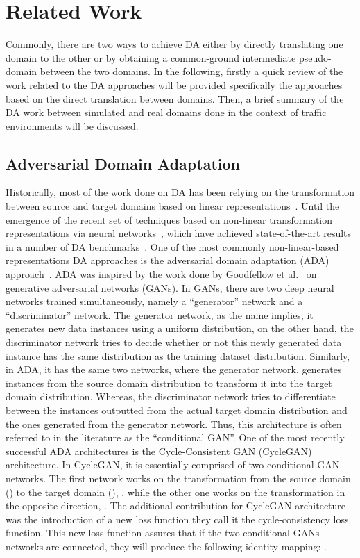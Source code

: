 \documentclass[letterpaper, 10 pt, conference]{IEEEtran}
\begin{document}
	
	
\section{Related Work}\label{related}
Commonly, there are two ways to achieve DA either by directly translating one domain to the other or by obtaining a common-ground intermediate pseudo-domain between the two domains. In the following, firstly a quick review of the work related to the DA approaches will be provided specifically the approaches based on the direct translation between domains. Then, a brief summary of the DA work between simulated and real domains done in the context of traffic environments will be discussed.

\subsection{Adversarial Domain Adaptation}\label{da}
Historically, most of the work done on DA has been relying on the transformation between source and target domains based on linear representations~\cite{blitzer2006domain,germain2013pac}. Until the emergence of the recent set of techniques based on non-linear transformation representations via neural networks~\cite{ganin2016domain,tzeng2017adversarial}, which have achieved state-of-the-art results in a number of DA benchmarks~\cite{netzer2011,lecun1998gradient}. One of the most commonly non-linear-based representations DA approaches is the adversarial domain adaptation (ADA) approach~\cite{ganin2016domain}. ADA was inspired by the work done by Goodfellow et al.~\cite{goodfellow2014generative} on generative adversarial networks (GANs). In GANs, there are two deep neural networks trained simultaneously, namely a ``generator'' network and a ``discriminator'' network. The generator network, as the name implies, it generates new data instances using a uniform distribution, on the other hand, the discriminator network tries to decide whether or not this newly generated data instance has the same distribution as the training dataset distribution. Similarly, in ADA, it has the same two networks, where the generator network, generates instances from the source domain distribution to transform it into the target domain distribution. Whereas, the discriminator network tries to differentiate between the instances outputted from the actual target domain distribution and the ones generated from the generator network. Thus, this architecture is often referred to in the literature as the ``conditional GAN''. One of the most recently successful ADA architectures is the Cycle-Consistent GAN (CycleGAN)~\cite{zhu2017unpaired} architecture. In CycleGAN, it is essentially comprised of two conditional GAN networks. The first network works on the transformation from the source domain () to the target domain (), , while the other one works on the transformation in the opposite direction, . The additional contribution for CycleGAN architecture was the introduction of a new loss function they call it the cycle-consistency loss function. This new loss function assures that if the two conditional GANs networks are connected, they will produce the following identity mapping: . 
\end{document}
